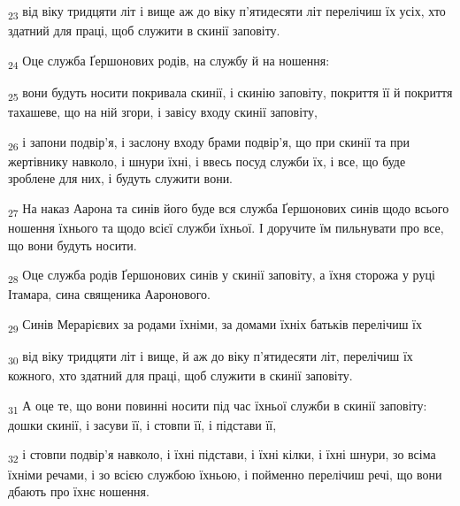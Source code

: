 \begin{tcolorbox}
\textsubscript{23} від віку тридцяти літ і вище аж до віку п'ятидесяти літ перелічиш їх усіх, хто здатний для праці, щоб служити в скинії заповіту.
\end{tcolorbox}
\begin{tcolorbox}
\textsubscript{24} Оце служба Ґершонових родів, на службу й на ношення:
\end{tcolorbox}
\begin{tcolorbox}
\textsubscript{25} вони будуть носити покривала скинії, і скинію заповіту, покриття її й покриття тахашеве, що на ній згори, і завісу входу скинії заповіту,
\end{tcolorbox}
\begin{tcolorbox}
\textsubscript{26} і запони подвір'я, і заслону входу брами подвір'я, що при скинії та при жертівнику навколо, і шнури їхні, і ввесь посуд служби їх, і все, що буде зроблене для них, і будуть служити вони.
\end{tcolorbox}
\begin{tcolorbox}
\textsubscript{27} На наказ Аарона та синів його буде вся служба Ґершонових синів щодо всього ношення їхнього та щодо всієї служби їхньої. І доручите їм пильнувати про все, що вони будуть носити.
\end{tcolorbox}
\begin{tcolorbox}
\textsubscript{28} Оце служба родів Ґершонових синів у скинії заповіту, а їхня сторожа у руці Ітамара, сина священика Ааронового.
\end{tcolorbox}
\begin{tcolorbox}
\textsubscript{29} Синів Мерарієвих за родами їхніми, за домами їхніх батьків перелічиш їх
\end{tcolorbox}
\begin{tcolorbox}
\textsubscript{30} від віку тридцяти літ і вище, й аж до віку п'ятидесяти літ, перелічиш їх кожного, хто здатний для праці, щоб служити в скинії заповіту.
\end{tcolorbox}
\begin{tcolorbox}
\textsubscript{31} А оце те, що вони повинні носити під час їхньої служби в скинії заповіту: дошки скинії, і засуви її, і стовпи її, і підстави її,
\end{tcolorbox}
\begin{tcolorbox}
\textsubscript{32} і стовпи подвір'я навколо, і їхні підстави, і їхні кілки, і їхні шнури, зо всіма їхніми речами, і зо всією службою їхньою, і пойменно перелічиш речі, що вони дбають про їхнє ношення.
\end{tcolorbox}
